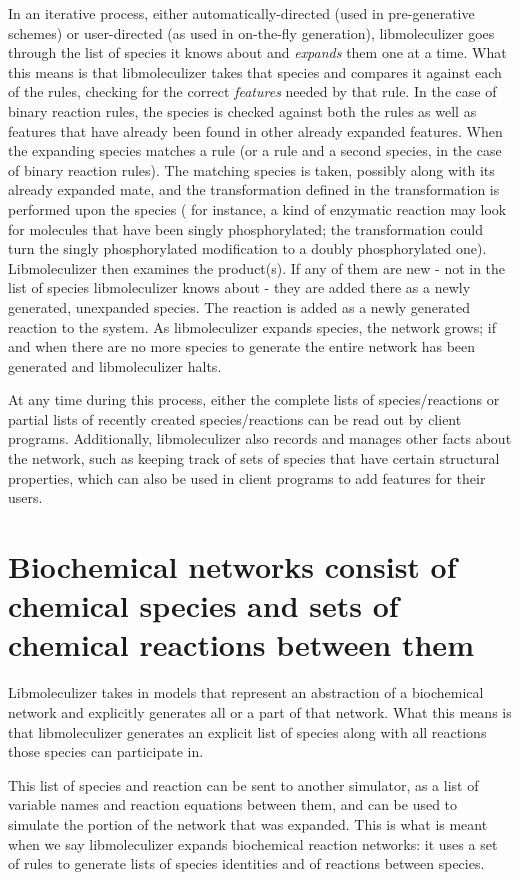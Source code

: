 In an iterative process, either automatically-directed (used in
pre-generative schemes) or user-directed (as used in on-the-fly
generation), libmoleculizer goes through the list of species it knows
about and {\it expands} them one at a time.  What this means is that
libmoleculizer takes that species and compares it against each of the
rules, checking for the correct {\it features} needed by that
rule.  In the case of binary reaction rules, the species is checked
against both the rules as well as features that have already been
found in other already expanded features.  When the expanding
species matches a rule (or a rule and a second species, in the case of
binary reaction rules).  The matching species is taken, possibly along
with its already expanded mate, and the transformation defined in the
transformation is performed upon the species ( for instance, a kind of
enzymatic reaction may look for molecules that have been singly
phosphorylated; the transformation could turn the singly
phosphorylated modification to a doubly phosphorylated
one). Libmoleculizer then examines the product(s).  If any of them are
new - not in the list of species libmoleculizer knows about - they
are added there as a newly generated, unexpanded species.  The
reaction is added as a newly generated reaction to the system.  As
libmoleculizer expands species, the network grows; if and when there
are no more species to generate the entire network has been generated
and libmoleculizer halts.  


At any time during this process, either the complete lists of
species/reactions or partial lists of recently created
species/reactions can be read out by client programs.  Additionally,
libmoleculizer also records and manages other facts about the network,
such as keeping track of sets of species that have certain structural
properties, which can also be used in client programs to add features
for their users.

\section{Biochemical networks consist of chemical species and sets of
  chemical  reactions between them}
Libmoleculizer takes in models that represent an abstraction of a
biochemical network and explicitly generates all or a part of that
network.  What this means is that libmoleculizer generates an explicit
list of species along with all reactions those species can participate
in.  

This list of species and reaction can be sent to another simulator, as
a list of variable names and reaction equations between them, and can
be used to simulate the portion of the network that was expanded.
This is what is meant when we say libmoleculizer expands biochemical
reaction networks: it uses a set of rules to generate lists of species
identities and of reactions between species.

